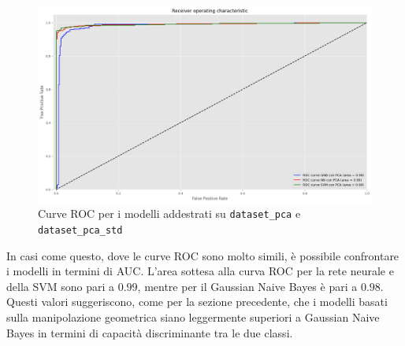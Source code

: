 \begin{figure}[!ht]
    \centering
    \includegraphics[width=\textwidth]{img/ris/roc_curve_pca.png}
    \caption{Curve ROC per i modelli addestrati su \texttt{dataset\_pca} e \texttt{dataset\_pca\_std}}
    \label{fig:roc_curve_pca}
\end{figure}

In casi come questo, dove le curve ROC sono molto simili, è possibile confrontare
i modelli in termini di AUC. L'area sottesa alla curva ROC per la rete neurale e
della SVM sono pari a $0.99$, mentre per il Gaussian Naive Bayes è pari a $0.98$.
Questi valori suggeriscono, come per la sezione precedente, che i modelli basati sulla manipolazione geometrica
siano leggermente superiori a Gaussian Naive Bayes in termini di capacità
discriminante tra le due classi.


